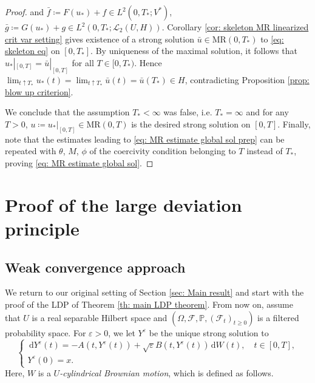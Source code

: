 \documentclass{amsart}
\newcommand{\dd}{\,\mathrm{d}}
\renewcommand{\MR}{\mathrm{MR}}
\newcommand{\UH}{\mathcal{L}_2(U,H)}
\newcommand{\<}{\langle}
\newcommand{\?}{\rangle}
\theoremstyle{plain}
\theoremstyle{remark}
\theoremstyle{plain}
\numberwithin{equation}{section}
\newcommand{\F}{\mathcal{F}}
\renewcommand{\P}{\mathbb{P}}
\newcommand{\Om}{\Omega}
\newcommand{\eps}{\varepsilon}
\begin{document}
\begin{proof}
 and $\bar{f}\coloneqq F(u_*)+f\in L^2(0,T_*;V^*)$, $\bar{g}\coloneqq G(u_*)+g\in L^2(0,T_*;\UH)$.
Corollary \ref{cor: skeleton MR linearized crit var setting} gives existence of a strong solution $\bar{u}\in \MR(0,T_*)$ to \eqref{eq: skeleton eq} on $[0,T_*]$.
By uniqueness of the maximal solution, it follows that $u_*|_{[0,T]}=\bar{u}|_{[0,T]}$ for all $T\in[0,T_*)$. Hence $\lim_{t\uparrow T_*}u_*(t)=\lim_{t\uparrow T_*}\bar{u}(t)=\bar{u}(T_*)\in H$, contradicting Proposition \ref{prop: blow up criterion}.

We conclude that the assumption $T_*<\infty$ was false, i.e. $T_*=\infty$ and for any $T>0$, $u\coloneqq u_*|_{[0,T]}\in\MR(0,T)$ is the desired strong solution on $[0,T]$. Finally, note that the estimates leading to \eqref{eq: MR estimate global sol prep} can be repeated with $\theta$, $M$, $\phi$ of the coercivity condition belonging to $T$ instead of $T_*$,  proving \eqref{eq: MR estimate global sol}.
\end{proof}



\section{Proof of the large deviation principle}\label{sec: proof LDP}

\subsection{Weak convergence approach}\label{sec: weak convergence approach}

We return to our original setting of Section \ref{sec: Main result} and start with the proof of the LDP of Theorem \ref{th: main LDP theorem}. From now on, assume that $U$ is a real separable Hilbert space and $(\Om,\F,\P,(\F_t)_{t\geq 0})$ is a filtered probability space. For $\eps>0$, we let $Y^\eps$ be the unique strong solution to
  \begin{equation}\label{eq: SPDE Y^eps}
  \begin{cases}
    \dd Y^\eps(t)=-A(t,Y^\eps(t))+\sqrt{\eps}B(t,Y^\eps(t))\dd W(t), \quad t\in[0,T],\\
    Y^\eps(0)=x.
  \end{cases}
  \end{equation}
Here, $W$ is a \emph{$U$-cylindrical Brownian motion}, which is defined as follows.
\end{document}
